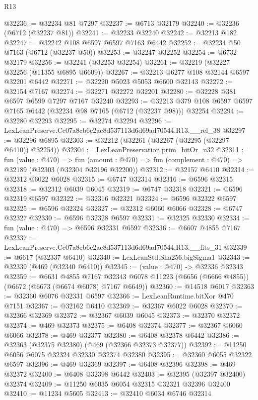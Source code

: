 \begin{lexlean}{R13}
\begin{coremodule}
@32236 := @32234 @81 @7297
@32237 := @6713 @32179
@32240 := @32236 (@6712 (@32237 @81))
@32241 := @32233 @32240
@32242 := @32213 @182
@32247 := @32242 @108 @6597 @6597 @7163 @6442
@32252 := @32234 @50 @7163 (@6712 (@32237 @50))
@32253 := @32247 @32252
@32254 := @6732 @32179
@32256 := @32241 (@32253 @32254)
@32261 := @32219 (@32227 @32256 (@11355 @6895 @6609))
@32267 := @32213 @6277 @108 @32144 @6597 @32201 @6442
@32271 := @32220 @5023 @5053 @6600 @32143
@32272 := @32154 @7167
@32274 := @32271 @32272 @32201
@32280 := @32228 @381 @6597 @6599 @7297 @7167 @32240
@32293 := @32213 @379 @108 @6597 @6597 @7165 @6442 (@32234 @98 @7165 (@6712 (@32237 @98))) @32254
@32294 := @32280 @32293
@32295 := @32274 @32294
@32296 := LexLeanPreserve.Cc07a8cb6c2ac8d537113d6d69ad70544.R13.__rel_38
@32297 := @32296 @6895
@32303 := @32212 (@32261 (@32267 (@32295 (@32297 @6410)) @32254))
@32304 := LexLeanPreservation.prim_bitOr_u32
@32311 := fun (value : @470) =>
  fun (amount : @470) => fun (complement : @470) => @32189 (@32303 (@32304 @32196 @32200))
@32312 := @32157 @6410
@32314 := @32312 @6022 @6028
@32315 := @6747 @32314
@32316 := @6596 @32315
@32318 := @32312 @6039 @6045
@32319 := @6747 @32318
@32321 := @6596 @32319 @6597
@32322 := @32316 @32321
@32324 := @6596 @32322 @6597
@32325 := @6596 @32324
@32327 := @32312 @6060 @6066
@32328 := @6747 @32327
@32330 := @6596 @32328 @6597
@32331 := @32325 @32330
@32334 := fun (value : @470) => @6596 @32331 @6597
@32336 := @6607 @4855 @7167
@32337 := LexLeanPreserve.Cc07a8cb6c2ac8d537113d6d69ad70544.R13.__fits_31
@32339 := @6617 (@32337 @6410)
@32340 := LexLeanStd.Sha256.bigSigma1
@32343 := @32339 (@469 (@32340 @6410))
@32345 := (value : @470) -> @32336 @32343
@32359 := @6631
    @4855
    @7167
    @32343
    @6078
    @11223
    (@6656 (@6666 @4855))
    (@6672 (@6673 (@6674 @6078) @7167 @6649))
@32360 := @14518 @6017
@32363 := @32360 @6076 @32331 @6597
@32366 := LexLeanRuntime.bitXor @470 @7151
@32367 := @32162 @6410
@32369 := @32367 @6022 @6028
@32370 := @32366 @32369
@32372 := @32367 @6039 @6045
@32373 := @32370 @32372
@32374 := @469 @32373
@32375 := @6408 @32374
@32377 := @32367 @6060 @6066
@32378 := @469 @32377
@32380 := @6408 @32378 @6442
@32386 := @32363 (@32375 @32380) (@469 (@32366 @32373 @32377))
@32392 := @11250 @6056 @6075 @32324 @32330 @32374 @32380
@32395 := @32360 @6055 @32322 @6597
@32396 := @469 @32369
@32397 := @6408 @32396
@32398 := @469 @32372
@32400 := @6408 @32398 @6442
@32403 := @32395 (@32397 @32400) @32374
@32409 := @11250 @6035 @6054 @32315 @32321 @32396 @32400
@32410 := @11234 @5605
@32413 := @32410 @6034 @6746 @32314

\end{coremodule}
\end{lexlean}

